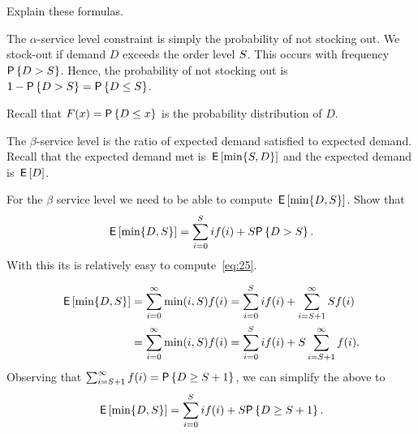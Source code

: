 \begin{exercise}
Explain these formulas.
\begin{solution}
The $\alpha$-service level constraint is simply the probability of not stocking out. We stock-out if demand $D$ exceeds the order level $S$. This occurs with frequency $\P{D> \Q}$. Hence, the probability of not stocking out is $1-\P{D>\Q} = \P{D\leq \Q}$. 

Recall that $F(x) = \P{D\leq x}$ is the probability distribution of $D$. 

The $\beta$-service level is the ratio of expected demand satisfied to expected demand. Recall that the expected demand met is $\,\mathsf{E}\left[\min\{S, D\}\right]$ and the expected demand is $\,\mathsf{E}\left[D\right]$. 
\end{solution}
\end{exercise}

\begin{exercise}
For the $\beta$ service level we need to be able to compute  $\,\mathsf{E}\left[\min\{D,S\}\right]$. Show that
\begin{equation*}
  \E{\min\{D,\Q\}} = \sum_{i=0}^\Q i\/ f(i) + \Q\/\P{D> \Q}.
\end{equation*}
With this its is relatively easy to compute~\eqref{eq:25}. 
  \begin{solution}
\begin{align*}
  \,\mathsf{E}\left[\min\{D,S\}\right] 
&= \sum_{i=0}^\infty \min(i,S)f(i) = \sum_{i=0}^S i f(i) + \sum_{i=S+1}^\infty S f(i) \\
&= \sum_{i=0}^\infty \min(i,S)f(i) = \sum_{i=0}^S i f(i) + S \sum_{i=S+1}^\infty f(i).
\end{align*}
Observing that $\sum_{i=\Q+1}^\infty f(i)=\P{D\geq \Q+1}$,  we can simplify the above to
\begin{equation*}
  \E{\min\{D,\Q\}} = \sum_{i=0}^\Q i\/ f(i) + \Q\/\P{D\geq \Q+1}.
\end{equation*}
  \end{solution}
\end{exercise}


